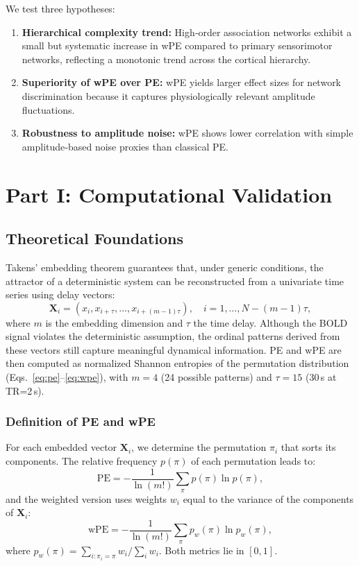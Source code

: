 \documentclass[12pt,a4paper]{article}
\begin{document}
	We test three hypotheses:
	\begin{enumerate}[label=H\arabic*:, leftmargin=*]
		\item \textbf{Hierarchical complexity trend:} High‑order association networks exhibit a small but systematic increase in wPE compared to primary sensorimotor networks, reflecting a monotonic trend across the cortical hierarchy.
		\item \textbf{Superiority of wPE over PE:} wPE yields larger effect sizes for network discrimination because it captures physiologically relevant amplitude fluctuations.
		\item \textbf{Robustness to amplitude noise:} wPE shows lower correlation with simple amplitude‑based noise proxies than classical PE.
	\end{enumerate}
	
	\section{Part I: Computational Validation}
	
	\subsection{Theoretical Foundations}
	Takens' embedding theorem \cite{takens1981} guarantees that, under generic conditions, the attractor of a deterministic system can be reconstructed from a univariate time series using delay vectors:
	\begin{equation}
		\mathbf{X}_i = (x_i, x_{i+\tau}, \dots, x_{i+(m-1)\tau}), \quad i = 1, \dots, N-(m-1)\tau,
		\label{eq:embedding}
	\end{equation}
	where $m$ is the embedding dimension and $\tau$ the time delay. Although the BOLD signal violates the deterministic assumption, the ordinal patterns derived from these vectors still capture meaningful dynamical information. PE and wPE are then computed as normalized Shannon entropies of the permutation distribution (Eqs.~\ref{eq:pe}--\ref{eq:wpe}), with $m=4$ (24 possible patterns) and $\tau=15$ (30\,s at TR=2\,s).
	
	\subsubsection{Definition of PE and wPE}
	For each embedded vector $\mathbf{X}_i$, we determine the permutation $\pi_i$ that sorts its components. The relative frequency $p(\pi)$ of each permutation leads to:
	\begin{equation}
		\text{PE} = -\frac{1}{\ln(m!)} \sum_{\pi} p(\pi) \ln p(\pi),
		\label{eq:pe}
	\end{equation}
	and the weighted version uses weights $w_i$ equal to the variance of the components of $\mathbf{X}_i$:
	\begin{equation}
		\text{wPE} = -\frac{1}{\ln(m!)} \sum_{\pi} p_w(\pi) \ln p_w(\pi),
		\label{eq:wpe}
	\end{equation}
	where $p_w(\pi) = \sum_{i:\pi_i=\pi} w_i / \sum_i w_i$. Both metrics lie in $[0,1]$.
	
\end{document}
